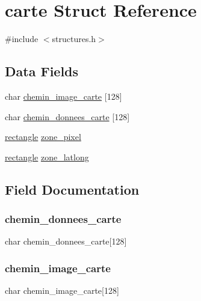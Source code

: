 \hypertarget{structcarte}{}\section{carte Struct Reference}
\label{structcarte}


{\ttfamily \#include $<$structures.\+h$>$}

\subsection*{Data Fields}
\begin{DoxyCompactItemize}
\item 
char \hyperlink{structcarte_a14ecc94c2719b58bbfd7b6249ff3ad4b}{chemin\+\_\+image\+\_\+carte} \mbox{[}128\mbox{]}
\item 
char \hyperlink{structcarte_aac690e5d54248ece98a26eb60fd0c179}{chemin\+\_\+donnees\+\_\+carte} \mbox{[}128\mbox{]}
\item 
\hyperlink{structrectangle}{rectangle} \hyperlink{structcarte_addf5558f9faa154e716d68678b042f98}{zone\+\_\+pixel}
\item 
\hyperlink{structrectangle}{rectangle} \hyperlink{structcarte_ad42edc35194368fcf17c221930cbabe0}{zone\+\_\+latlong}
\end{DoxyCompactItemize}


\subsection{Field Documentation}
\hypertarget{structcarte_aac690e5d54248ece98a26eb60fd0c179}{}\label{structcarte_aac690e5d54248ece98a26eb60fd0c179} 
\subsubsection{\texorpdfstring{chemin\+\_\+donnees\+\_\+carte}{chemin\_donnees\_carte}}
{\footnotesize\ttfamily char chemin\+\_\+donnees\+\_\+carte\mbox{[}128\mbox{]}}

\hypertarget{structcarte_a14ecc94c2719b58bbfd7b6249ff3ad4b}{}\label{structcarte_a14ecc94c2719b58bbfd7b6249ff3ad4b} 
\subsubsection{\texorpdfstring{chemin\+\_\+image\+\_\+carte}{chemin\_image\_carte}}
{\footnotesize\ttfamily char chemin\+\_\+image\+\_\+carte\mbox{[}128\mbox{]}}

